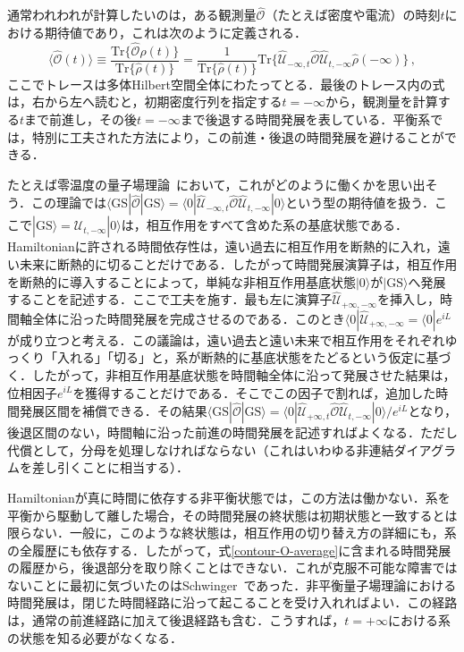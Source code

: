 \documentclass[a4paper,11pt]{ltjsarticle}
\def\Tr{\mathrm{Tr}}
\begin{document}
通常われわれが計算したいのは，ある観測量$\hat{\mathcal{O}}$（たとえば密度や電流）の時刻$t$における期待値であり，これは次のように定義される．
\begin{equation}\label{contour-O-average}
\big\langle\hat{\mathcal{O}}(t)\big\rangle\equiv
\frac{\Tr\{\hat{\mathcal{O}}\hat{\rho}(t)\}}
{\Tr\{\hat{\rho}(t)\}}=\frac{1}{\Tr\{\hat{\rho}(t)\}}
\Tr\big\{\hat{\mathcal{U}}_{-\infty,t}\hat{\mathcal{O}}
\hat{\mathcal{U}}_{t,-\infty}\hat{\rho}(-\infty)\big\}\,,
\end{equation}ここでトレースは多体Hilbert空間全体にわたってとる．最後のトレース内の式は，右から左へ読むと，初期密度行列を指定する$t=-\infty$から，観測量を計算する$t$まで前進し，その後$t=-\infty$まで後退する時間発展を表している．平衡系では，特別に工夫された方法により，この前進・後退の時間発展を避けることができる．


たとえば零温度の量子場理論~\cite{AGD}において，これがどのように働くかを思い出そう．この理論では$\langle\mathrm{GS}|\hat{\mathcal{O}}|\mathrm{GS}\rangle=
\langle0|\hat{\mathcal{U}}_{-\infty,t}\hat{\mathcal{O}}
\hat{\mathcal{U}}_{t,-\infty}|0\rangle$という型の期待値を扱う．ここで$|\mathrm{GS}\rangle=\hat{\mathcal{U}}_{t,-\infty}|0\rangle$は，相互作用をすべて含めた系の基底状態である．Hamiltonianに許される時間依存性は，遠い過去に相互作用を断熱的に入れ，遠い未来に断熱的に切ることだけである．したがって時間発展演算子は，相互作用を断熱的に導入することによって，単純な非相互作用基底状態$|0\rangle$が$|\mathrm{GS}\rangle$へ発展することを記述する．ここで工夫を施す．最も左に演算子$\hat{\mathcal{U}}_{+\infty,-\infty}$を挿入し，時間軸全体に沿った時間発展を完成させるのである．このとき$\langle0|\hat{\mathcal{U}}_{+\infty,-\infty}=\langle0|e^{iL}$が成り立つと考える．この議論は，遠い過去と遠い未来で相互作用をそれぞれゆっくり「入れる」「切る」と，系が断熱的に基底状態をたどるという仮定に基づく．したがって，非相互作用基底状態を時間軸全体に沿って発展させた結果は，位相因子$e^{iL}$を獲得することだけである．そこでこの因子で割れば，追加した時間発展区間を補償できる．その結果$\langle\mathrm{GS}|\hat{\mathcal{O}}|\mathrm{GS}\rangle=
\langle0|\hat{\mathcal{U}}_{+\infty,t}\hat{\mathcal{O}}
\hat{\mathcal{U}}_{t,-\infty}|0\rangle/e^{iL}$となり，後退区間のない，時間軸に沿った前進の時間発展を記述すればよくなる．ただし代償として，分母を処理しなければならない（これはいわゆる非連結ダイアグラムを差し引くことに相当する）．


Hamiltonianが真に時間に依存する非平衡状態では，この方法は働かない．系を平衡から駆動して離した場合，その時間発展の終状態は初期状態と一致するとは限らない．一般に，このような終状態は，相互作用の切り替え方の詳細にも，系の全履歴にも依存する．したがって，式\eqref{contour-O-average}に含まれる時間発展の履歴から，後退部分を取り除くことはできない．これが克服不可能な障害ではないことに最初に気づいたのはSchwinger~\cite{Schwinger}であった．非平衡量子場理論における時間発展は，閉じた時間経路に沿って起こることを受け入れればよい．この経路は，通常の前進経路に加えて後退経路も含む．こうすれば，$t=+\infty$における系の状態を知る必要がなくなる．
\end{document}
